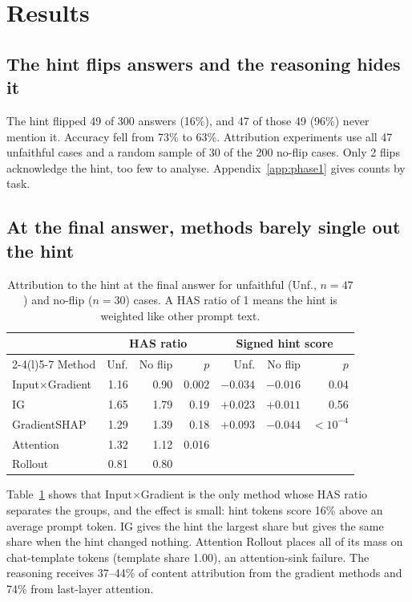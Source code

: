 \documentclass[10pt,a4paper,twocolumn]{article}
\newcommand{\ixg}{Input$\times$Gradient}
\begin{document}
\section{Results}

\subsection{The hint flips answers and the reasoning hides it}

The hint flipped 49 of 300 answers (16\%), and 47 of those 49 (96\%) never mention it. Accuracy fell from 73\% to 63\%. Attribution experiments use all 47 unfaithful cases and a random sample of 30 of the 200 no-flip cases. Only 2 flips acknowledge the hint, too few to analyse. Appendix~\ref{app:phase1} gives counts by task.

\subsection{At the final answer, methods barely single out the hint}

\begin{table}[t]
\centering\footnotesize
\setlength{\tabcolsep}{4.4pt}
\begin{tabular}{@{}lrrrrrr@{}}
\toprule
 & \multicolumn{3}{c}{HAS ratio} & \multicolumn{3}{c}{Signed hint score} \\
\cmidrule(lr){2-4}\cmidrule(l){5-7}
Method & Unf. & No flip & $p$ & Unf. & No flip & $p$ \\
\midrule
\ixg & 1.16 & 0.90 & 0.002 & $-0.034$ & $-0.016$ & 0.04 \\
IG & 1.65 & 1.79 & 0.19 & $+0.023$ & $+0.011$ & 0.56 \\
GradientSHAP & 1.29 & 1.39 & 0.18 & $+0.093$ & $-0.044$ & $<\!10^{-4}$ \\
Attention & 1.32 & 1.12 & 0.016 & & & \\
Rollout & 0.81 & 0.80 & & & & \\
\bottomrule
\end{tabular}
\caption{Attribution to the hint at the final answer for unfaithful (Unf., $n=47$) and no-flip ($n=30$) cases. A HAS ratio of 1 means the hint is weighted like other prompt text.}
\label{tab:final}
\end{table}

Table~\ref{tab:final} shows that \ixg{} is the only method whose HAS ratio separates the groups, and the effect is small: hint tokens score 16\% above an average prompt token. IG gives the hint the largest share but gives the same share when the hint changed nothing. Attention Rollout places all of its mass on chat-template tokens (template share 1.00), an attention-sink failure. The reasoning receives 37--44\% of content attribution from the gradient methods and 74\% from last-layer attention.
\end{document}
